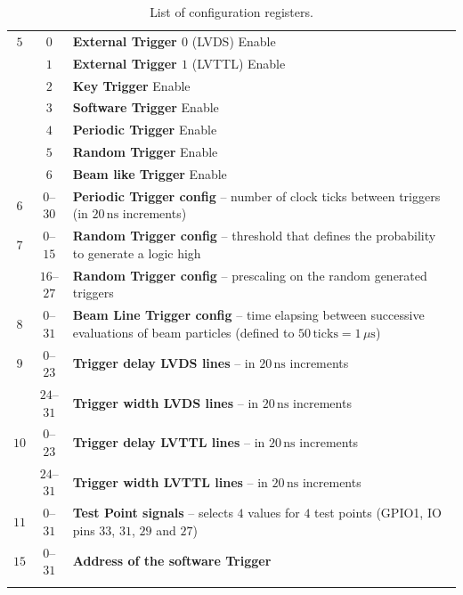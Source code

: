 {\begin{longtable}[H]{|c|c|p{11.5cm}|}
		\hline
		$5$ & $0$ & \textbf{External Trigger $0$} (LVDS) Enable \\
		& $1$ & \textbf{External Trigger $1$} (LVTTL) Enable \\
		& $2$ & \textbf{Key Trigger} Enable \\
		& $3$ & \textbf{Software Trigger} Enable \\
		& $4$ & \textbf{Periodic Trigger} Enable \\
		& $5$ & \textbf{Random Trigger} Enable \\
		& $6$ & \textbf{Beam like Trigger} Enable \\
		\hline
		$6$ & $0$--$30$ & \textbf{Periodic Trigger config} -- number of clock ticks between triggers (in $20\,\mathrm{ns}$ increments) \\
		\hline
		$7$ & $0$--$15$ & \textbf{Random Trigger config} -- threshold that defines the probability to generate a logic high \\
		& $16$--$27$ & \textbf{Random Trigger config} -- prescaling on the random generated triggers \\
		\hline
		$8$ & $0$--$31$ & \textbf{Beam Line Trigger config} -- time elapsing between successive evaluations of beam particles (defined to $50\,\mathrm{ticks}=1\,\mu\mathrm{s}$) \\
		\hline
		$9$ & $0$--$23$ & \textbf{Trigger delay LVDS lines} -- in $20\,\mathrm{ns}$ increments \\
		& $24$--$31$ & \textbf{Trigger width LVDS lines} -- in $20\,\mathrm{ns}$ increments \\
		\hline
		$10$ & $0$--$23$ & \textbf{Trigger delay LVTTL lines} -- in $20\,\mathrm{ns}$ increments \\
		& $24$--$31$ & \textbf{Trigger width LVTTL lines} -- in $20\,\mathrm{ns}$ increments \\
		\hline
		$11$ & $0$--$31$ & \textbf{Test Point signals} -- selects $4$ values for $4$ test points (GPIO1, IO pins $33$, $31$, $29$ and $27$) \\
		\hline
		$15$ & $0$--$31$ & \textbf{Address of the software Trigger} \\
		\hline
		\caption[TrgBox configuration registers]{List of configuration registers.}
		\label{tab:config_registers}
\end{longtable}}
